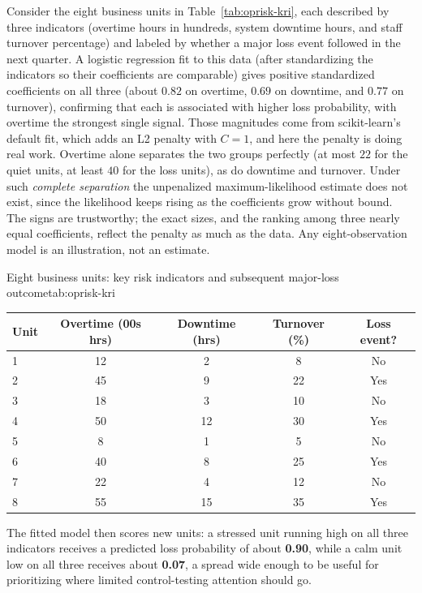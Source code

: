 \documentclass[../ai_in_finance]{subfiles}
\begin{document}
Consider the eight business units in Table~\ref{tab:oprisk-kri}, each described by three indicators (overtime hours in hundreds, system downtime hours, and staff turnover percentage) and labeled by whether a major loss event followed in the next quarter. A logistic regression fit to this data (after standardizing the indicators so their coefficients are comparable) gives positive standardized coefficients on all three (about $0.82$ on overtime, $0.69$ on downtime, and $0.77$ on turnover), confirming that each is associated with higher loss probability, with overtime the strongest single signal.
Those magnitudes come from scikit-learn's default fit, which adds an L2 penalty with $C=1$, and here the penalty is doing real work. Overtime alone separates the two groups perfectly (at most $22$ for the quiet units, at least $40$ for the loss units), as do downtime and turnover. Under such \emph{complete separation} the unpenalized maximum-likelihood estimate does not exist, since the likelihood keeps rising as the coefficients grow without bound. The signs are trustworthy; the exact sizes, and the ranking among three nearly equal coefficients, reflect the penalty as much as the data. Any eight-observation model is an illustration, not an estimate.

\begin{booktable}[htbp]{Eight business units: key risk indicators and subsequent major-loss outcome}{tab:oprisk-kri}
\begin{tabular}{lcccc}
\toprule
Unit & Overtime (00s hrs) & Downtime (hrs) & Turnover (\%) & Loss event? \\
\midrule
1 & 12 & 2  & 8  & No \\
2 & 45 & 9  & 22 & Yes \\
3 & 18 & 3  & 10 & No \\
4 & 50 & 12 & 30 & Yes \\
5 & 8  & 1  & 5  & No \\
6 & 40 & 8  & 25 & Yes \\
7 & 22 & 4  & 12 & No \\
8 & 55 & 15 & 35 & Yes \\
\bottomrule
\end{tabular}
\end{booktable}

The fitted model then scores new units: a stressed unit running high on all three indicators receives a predicted loss probability of about \textbf{0.90}, while a calm unit low on all three receives about \textbf{0.07}, a spread wide enough to be useful for prioritizing where limited control-testing attention should go.
\end{document}

